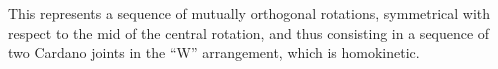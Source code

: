 \documentclass[10pt,fleqn,subeqn]{report}
\newcommand{\T}[1]{\bm{#1}}
\begin{document}
This represents a sequence of mutually orthogonal rotations,
symmetrical with respect to the mid of the central rotation,
and thus consisting in a sequence of two Cardano joints
in the ``W'' arrangement, which is homokinetic.

\end{document}
